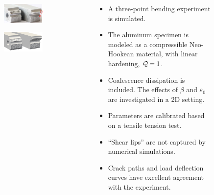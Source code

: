 \begin{frame}
\begin{columns}[T]
\begin{column}{0.6\textwidth}
\begin{figure}
        \begin{subfigure}[b]{0.45\textwidth}
          \centering
          \includegraphics[width=0.9\textwidth,scale=0.5]{Chapter345/figures/split_experiment}
        \end{subfigure}
        \begin{subfigure}[b]{0.45\textwidth}
          \centering
          \includegraphics[width=0.9\textwidth,scale=0.5]{Chapter345/figures/split}
        \end{subfigure}
      \end{figure}
    \end{column}
    \begin{column}{0.4\textwidth}
      \begin{itemize}
        \item A \textcolor{peggyblue}{three-point bending} experiment is simulated.
        \item The \textcolor{peggyblue}{aluminum} specimen is modeled as a \textcolor{peggyblue}{compressible Neo-Hookean} material, with \textcolor{peggyblue}{linear hardening}, \textcolor{peggyblue}{$\mathcal{Q} = 1$}.
        \item \textcolor{peggyblue}{Coalescence dissipation} is included. The effects of $\beta$ and $\varepsilon_0$ are investigated in a 2D setting.
        \item Parameters are calibrated based on a \textcolor{peggyblue}{tensile tension test}.
        \item ``Shear lips'' are not captured by numerical simulations.
        \item Crack paths and load deflection curves have \textcolor{peggyblue}{excellent agreement} with the experiment.
      \end{itemize}
    \end{column}
  \end{columns}
\end{frame}


